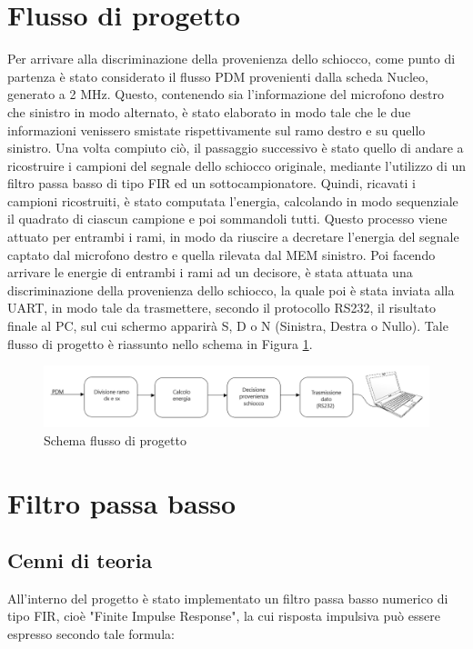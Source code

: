 \documentclass[a4paper, titlepage]{article}
\begin{document}
\section{Flusso di progetto}
Per arrivare alla discriminazione della provenienza dello schiocco, come punto di partenza è stato considerato il flusso PDM provenienti dalla scheda Nucleo, generato a 2 MHz. Questo, contenendo sia l'informazione del microfono destro che sinistro in modo alternato, è stato elaborato in modo tale che le due informazioni venissero smistate rispettivamente sul ramo destro e su quello sinistro. Una volta compiuto ciò, il passaggio successivo è stato quello di andare a ricostruire i campioni del segnale dello schiocco originale, mediante l'utilizzo di un filtro passa basso di tipo FIR ed un sottocampionatore. Quindi, ricavati i campioni ricostruiti, è stato computata l'energia, calcolando in modo sequenziale il quadrato di ciascun campione e poi sommandoli tutti. Questo processo viene attuato per entrambi i rami, in modo da riuscire a decretare l'energia del segnale captato dal microfono destro e quella rilevata dal MEM sinistro. Poi facendo arrivare le energie di entrambi i rami ad un decisore, è stata attuata una discriminazione della provenienza dello schiocco, la quale poi è stata inviata alla UART, in modo tale da trasmettere, secondo il protocollo RS232, il risultato finale al PC, sul cui schermo apparirà S, D o N (Sinistra, Destra o Nullo). 
Tale flusso di progetto è riassunto nello schema in Figura \ref{fig:flusso_progetto}.

\begin{figure}[H]
    \centering
    \includegraphics[width=1\textwidth]{flusso_progetto.PNG}
    \caption{Schema flusso di progetto}
    \label{fig:flusso_progetto}
\end{figure}

\section{Filtro passa basso}
\subsection{Cenni di teoria}
All'interno del progetto è stato implementato un filtro passa basso numerico di tipo FIR, cioè "Finite Impulse Response", la cui risposta impulsiva può essere espresso secondo tale formula:
\end{document}
